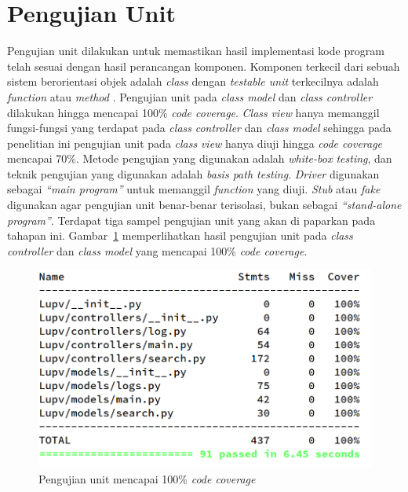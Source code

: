 


\section{Pengujian Unit}

Pengujian unit dilakukan untuk memastikan hasil implementasi kode program telah
sesuai dengan hasil perancangan komponen. Komponen terkecil dari sebuah sistem
berorientasi objek adalah \emph{class} dengan \emph{testable unit} terkecilnya
adalah \emph{function} atau \emph{method}
\parencite{pressman2010software}. Pengujian unit pada \emph{class model} dan
\emph{class controller} dilakukan hingga mencapai 100\% \emph{code
  coverage}. \emph{Class} \emph{view} hanya memanggil fungsi-fungsi
yang terdapat pada \emph{class} \emph{controller} dan \emph{class model} sehingga pada
penelitian ini pengujian unit pada \emph{class} \emph{view} hanya diuji hingga
\emph{code coverage} mencapai 70\%. Metode pengujian yang digunakan adalah
\emph{white-box testing}, dan teknik pengujian yang digunakan adalah
\emph{basis path testing}. \emph{Driver} digunakan sebagai
\emph{``main program''} untuk memanggil \emph{function} yang diuji.
\emph{Stub} atau \emph{fake} digunakan agar pengujian unit benar-benar
terisolasi, bukan sebagai \emph{``stand-alone program''}.
Terdapat tiga sampel pengujian unit yang akan di paparkan pada tahapan
ini. Gambar~\ref{fig:unit-test-coverage} memperlihatkan hasil pengujian unit pada \emph{class controller}
dan \emph{class model} yang mencapai 100\% \emph{code coverage}.

\begin{figure}[tph]
  \centering
  \includegraphics[width=.6\linewidth]{img/unit-test-coverage-cropped}
  \caption{Pengujian unit mencapai 100\% \emph{code coverage}}
  \label{fig:unit-test-coverage}
\end{figure}

